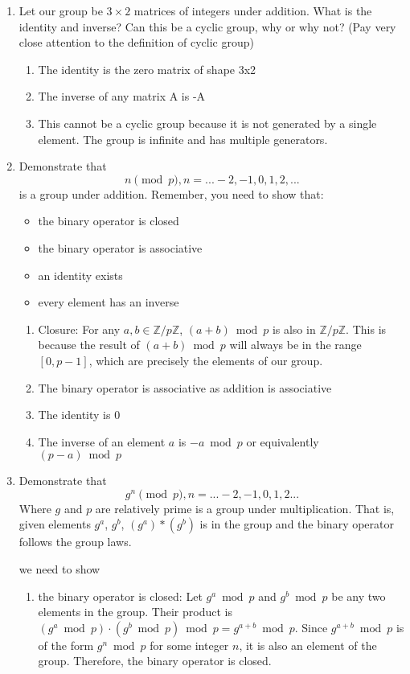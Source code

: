 \documentclass{article}
\begin{document}
\begin{enumerate}
    \item Let our group be $3 \times 2$ matrices of integers under addition. What is the identity and inverse? Can this be a cyclic group, why or why not? (Pay very close attention to the definition of cyclic group)
    \begin{enumerate}
        \item The identity is the zero matrix of shape 3x2
        \item The inverse of any matrix A is -A
        \item This cannot be a cyclic group because it is not generated by a single element. The group is infinite and has multiple generators.
    \end{enumerate}
    \item Demonstrate that
    \[
    n \pmod p, n=...-2,-1,0,1,2,...
    \]
    is a group under addition. Remember, you need to show that:
    \begin{itemize}
        \item the binary operator is closed
        \item the binary operator is associative
        \item an identity exists
        \item every element has an inverse
    \end{itemize}
    
    \begin{enumerate}
        \item Closure: For any $a, b \in \mathbb{Z}/p\mathbb{Z}$, $(a + b) \bmod p$ is also in $\mathbb{Z}/p\mathbb{Z}$. 
           This is because the result of $(a + b) \bmod p$ will always be in the range $[0, p-1]$, which are precisely the elements of our group.
        \item The binary operator is associative as addition is associative 
        \item The identity is 0
        \item The inverse of an element $a$ is $-a \bmod p$ or equivalently $(p-a) \bmod p$
    \end{enumerate}


    \item Demonstrate that
    \[
    g^{n} \pmod p, n=...-2, -1, 0, 1, 2...
    \]
    Where $g$ and $p$ are relatively prime is a group under multiplication. That is, given elements $g^a$, $g^b$, $(g^a)*(g^b)$ is in the group and the binary operator follows the group laws.
    
    we need to show
    \begin{enumerate}
        \item the binary operator is closed:
        Let $g^a \bmod p$ and $g^b \bmod p$ be any two elements in the group.
        Their product is $(g^a \bmod p) \cdot (g^b \bmod p) \bmod p = g^{a+b} \bmod p$.
        Since $g^{a+b} \bmod p$ is of the form $g^n \bmod p$ for some integer $n$, it is also an element of the group.
        Therefore, the binary operator is closed.
        

\end{enumerate}
\end{enumerate}
\end{document}
